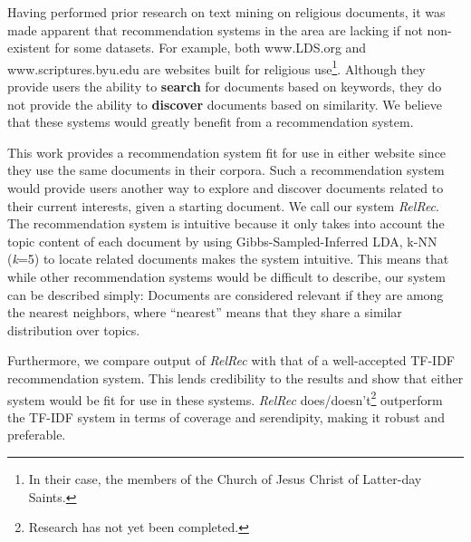 
Having performed prior research on text mining on religious documents, it was made apparent that recommendation systems in the area are lacking if not non-existent for some datasets. For example, both www.LDS.org and www.scriptures.byu.edu are websites built for religious use\footnote{In their case, the members of the Church of Jesus Christ of Latter-day Saints.}. Although they provide users the ability to \textbf{search} for documents based on keywords, they do not provide the ability to \textbf{discover} documents based on similarity. We believe that these systems would greatly benefit from a recommendation system.

This work provides a recommendation system fit for use in either website since they use the same documents in their corpora. Such a recommendation system would provide users another way to explore and discover documents related to their current interests, given a starting document. We call our system \textit{RelRec}. The recommendation system is intuitive because it only takes into account the topic content of each document by using Gibbs-Sampled-Inferred LDA, k-NN (\textit{k}=5) to locate related documents makes the system intuitive. This means that while other recommendation systems would be difficult to describe, our system can be described simply: Documents are considered relevant if they are among the nearest neighbors, where ``nearest'' means that they share a similar distribution over topics. %

Furthermore, we compare output of \textit{RelRec} with that of a well-accepted TF-IDF recommendation system. This lends credibility to the results and show that either system would be fit for use in these systems. \textit{RelRec} does/doesn't\footnote{Research has not yet been completed.} outperform the TF-IDF system in terms of coverage and serendipity, making it robust and preferable.
